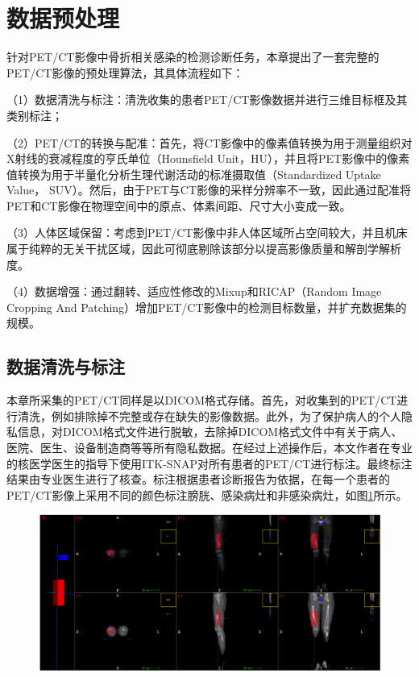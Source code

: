 \section{数据预处理}

针对PET/CT影像中骨折相关感染的检测诊断任务，本章提出了一套完整的PET/CT影像的预处理算法，其具体流程如下：

（1）数据清洗与标注：清洗收集的患者PET/CT影像数据并进行三维目标框及其类别标注；

（2）PET/CT的转换与配准：首先，将CT影像中的像素值转换为用于测量组织对X射线的衰减程度的亨氏单位（Hounsfield Unit，HU），并且将PET影像中的像素值转换为用于半量化分析生理代谢活动的标准摄取值（Standardized Uptake Value， SUV）。然后，由于PET与CT影像的采样分辨率不一致，因此通过配准将PET和CT影像在物理空间中的原点、体素间距、尺寸大小变成一致。

（3）人体区域保留：考虑到PET/CT影像中非人体区域所占空间较大，并且机床属于纯粹的无关干扰区域，因此可彻底剔除该部分以提高影像质量和解剖学解析度。

（4）数据增强：通过翻转、适应性修改的Mixup和RICAP（Random Image Cropping And Patching）增加PET/CT影像中的检测目标数量，并扩充数据集的规模。

\subsection{数据清洗与标注}

本章所采集的PET/CT同样是以DICOM格式存储。首先，对收集到的PET/CT进行清洗，例如排除掉不完整或存在缺失的影像数据。此外，为了保护病人的个人隐私信息，对DICOM格式文件进行脱敏，去除掉DICOM格式文件中有关于病人、医院、医生、设备制造商等等所有隐私数据。在经过上述操作后，本文作者在专业的核医学医生的指导下使用ITK-SNAP对所有患者的PET/CT进行标注。最终标注结果由专业医生进行了核查。标注根据患者诊断报告为依据，在每一个患者的PET/CT影像上采用不同的颜色标注膀胱、感染病灶和非感染病灶，如图\ref{fig:chap04_label}所示。

\begin{figure}[htbp]
  \centering
  \includegraphics[width=\textwidth]{figures/chap04_label.jpg}
  \label{fig:chap04_label}
\end{figure}

